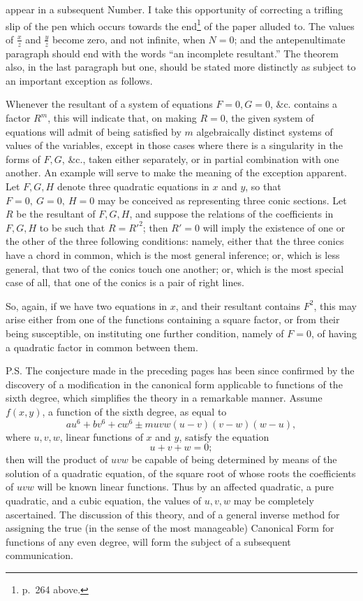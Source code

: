 \documentclass[11pt]{article}
\newcommand{\sourcepage}[1]{\marginpar{\scriptsize p.~#1}}
\begin{document}
\sourcepage{283}
appear in a subsequent Number. I take this opportunity of correcting a trifling slip of the pen which occurs towards the end\footnote{p.~264 above.} of the paper alluded to. The values of $\frac{x}{z}$ and $\frac{y}{z}$ become zero, and not infinite, when $N=0$; and the antepenultimate paragraph should end with the words ``an incomplete resultant.'' The theorem also, in the last paragraph but one, should be stated more distinctly as subject to an important exception as follows.

Whenever the resultant of a system of equations $F=0,G=0$, \&c. contains a factor $R^m$, this will indicate that, on making $R=0$, the given system of equations will admit of being satisfied by $m$ algebraically distinct systems of values of the variables, except in those cases where there is a singularity in the forms of $F,G$, \&c., taken either separately, or in partial combination with one another. An example will serve to make the meaning of the exception apparent. Let $F,G,H$ denote three quadratic equations in $x$ and $y$, so that $F=0,\ G=0,\ H=0$ may be conceived as representing three conic sections. Let $R$ be the resultant of $F,G,H$, and suppose the relations of the coefficients in $F,G,H$ to be such that $R=R'^2$; then $R'=0$ will imply the existence of one or the other of the three following conditions: namely, either that the three conics have a chord in common, which is the most general inference; or, which is less general, that two of the conics touch one another; or, which is the most special case of all, that one of the conics is a pair of right lines.

So, again, if we have two equations in $x$, and their resultant contains $F^2$, this may arise either from one of the functions containing a square factor, or from their being susceptible, on instituting one further condition, namely of $F=0$, of having a quadratic factor in common between them.

P.S. The conjecture made in the preceding pages has been since confirmed by the discovery of a modification in the canonical form applicable to functions of the sixth degree, which simplifies the theory in a remarkable manner. Assume $f(x,y)$, a function of the sixth degree, as equal to
\[
au^6+bv^6+cw^6\pm muvw(u-v)(v-w)(w-u),
\]
where $u,v,w$, linear functions of $x$ and $y$, satisfy the equation
\[
u+v+w=0;
\]
then will the product of $uvw$ be capable of being determined by means of the solution of a quadratic equation, of the square root of whose roots the coefficients of $uvw$ will be known linear functions. Thus by an affected quadratic, a pure quadratic, and a cubic equation, the values of $u,v,w$ may be completely ascertained. The discussion of this theory, and of a general inverse method for assigning the true (in the sense of the most manageable) Canonical Form for functions of any even degree, will form the subject of a subsequent communication.
\end{document}
